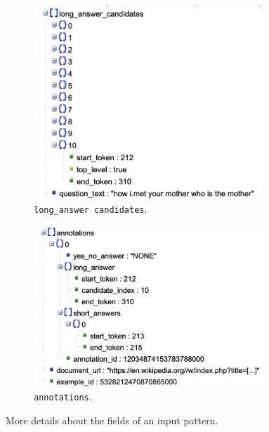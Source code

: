 \documentclass[10pt,hidelinks]{article}
\begin{document}
\begin{figure}[ht]
	\begin{subfigure}{.47\textwidth}
		\centering
		\includegraphics[width=0.95\textwidth]{pics/long_answer_candidates.png}
		\caption{\texttt{long\_answer candidates}.}\label{fig:long_answer_candidates}
	\end{subfigure}
	\begin{subfigure}{.53\textwidth}
		\centering
		\includegraphics[width=0.95\textwidth]{pics/annotations.png}
		\caption{\texttt{annotations}.}\label{fig:annotations}
	\end{subfigure}
	\caption{More details about the fields of an input pattern.}
	\label{fig:json_zoomed}
\end{figure}
\end{document}
